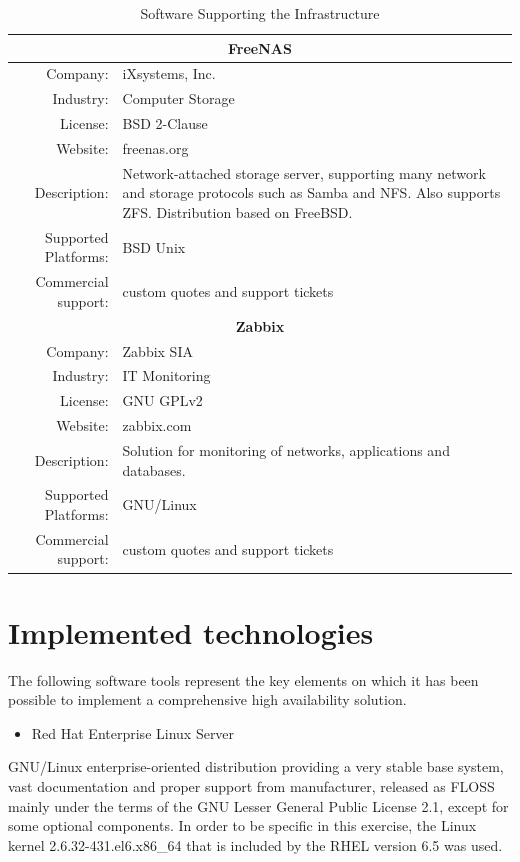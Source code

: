 \documentclass[a4paper, 12pt]{book}
\begin{document}
\begin{table}
\begin{tabular}{ | r m{10cm} | }
    \hline    
    \multicolumn{2}{|c|}{\textbf{FreeNAS}}\\
    \hline
    Company: & iXsystems, Inc. \\
    Industry: & Computer Storage \\
    License: & BSD 2-Clause \\
    Website: & freenas.org \\
    Description: & Network-attached storage server, supporting many network and storage protocols such as Samba and NFS. Also supports ZFS. Distribution based on FreeBSD. \\
    Supported Platforms: & BSD Unix \\
    Commercial support: & custom quotes and support tickets \\
    \hline
    \multicolumn{2}{|c|}{\textbf{Zabbix}}\\
    \hline
    Company: & Zabbix SIA \\
    Industry: & IT Monitoring \\
    License: & GNU GPLv2 \\
    Website: & zabbix.com \\
    Description: & Solution for monitoring of networks, applications and databases. \\
    Supported Platforms: & GNU/Linux \\
    Commercial support: & custom quotes and support tickets \\
    \hline
  \end{tabular}
\caption{Software Supporting the Infrastructure}
\label{table:technologies}
\end{table}



%
\chapter{Implemented technologies}
\label{chap:implemented}

The following software tools represent the key elements on which it has been possible to implement a comprehensive high availability solution. 

\begin{itemize}
	\item Red Hat Enterprise Linux Server
\end{itemize}

\noindent GNU/Linux enterprise-oriented distribution providing a very stable base system, vast documentation and proper support from manufacturer, released as FLOSS mainly under the terms of the GNU Lesser General Public License 2.1, except for some optional components. In order to be specific in this exercise, the Linux kernel 2.6.32-431.el6.x86\_64 that is included by the RHEL version 6.5 was used.
\end{document}
